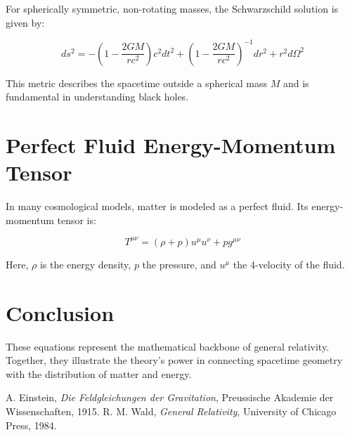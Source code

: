 \documentclass[12pt]{article}
\begin{document}
For spherically symmetric, non-rotating masses, the Schwarzschild solution is given by:

\begin{equation}
ds^2 = -\left(1 - \frac{2GM}{r c^2} \right)c^2 dt^2 + \left(1 - \frac{2GM}{r c^2} \right)^{-1} dr^2 + r^2 d\Omega^2
\end{equation}

This metric describes the spacetime outside a spherical mass \( M \) and is fundamental in understanding black holes.

\section{Perfect Fluid Energy-Momentum Tensor}

In many cosmological models, matter is modeled as a perfect fluid. Its energy-momentum tensor is:

\begin{equation}
T^{\mu \nu} = (\rho + p) u^\mu u^\nu + p g^{\mu \nu}
\end{equation}

Here, \( \rho \) is the energy density, \( p \) the pressure, and \( u^\mu \) the 4-velocity of the fluid.

\section{Conclusion}

These equations represent the mathematical backbone of general relativity. Together, they illustrate the theory’s power in connecting spacetime geometry with the distribution of matter and energy.


\begin{thebibliography}{9}
  A. Einstein,
  \textit{Die Feldgleichungen der Gravitation},
  Preussische Akademie der Wissenschaften, 1915.
  R. M. Wald,
  \textit{General Relativity},
  University of Chicago Press, 1984.
\end{thebibliography}
\end{document}
